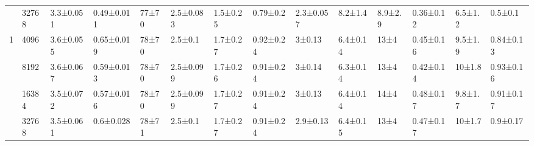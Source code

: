 \begin{table}
{\begin{tabular}{llllllllllllll}
 & 32768 & 3.3±0.051 & 0.49±0.011 & 77±70 & 2.5±0.083 & 1.5±0.25 & 0.79±0.2 & 2.3±0.057 & 8.2±1.4 & 8.9±2.9 & 0.36±0.12 & 6.5±1.2 & 0.5±0.1 \\
\cline{1-14}
\multirow[t]{4}{*}{1} & 4096 & 3.6±0.055 & 0.65±0.019 & 78±70 & 2.5±0.1 & 1.7±0.27 & 0.92±0.24 & 3±0.13 & 6.4±0.14 & 13±4 & 0.45±0.16 & 9.5±1.9 & 0.84±0.13 \\
 & 8192 & 3.6±0.067 & 0.59±0.013 & 78±70 & 2.5±0.099 & 1.7±0.26 & 0.91±0.24 & 3±0.14 & 6.3±0.14 & 13±4 & 0.42±0.14 & 10±1.8 & 0.93±0.16 \\
 & 16384 & 3.5±0.072 & 0.57±0.016 & 78±70 & 2.5±0.099 & 1.7±0.27 & 0.91±0.24 & 3±0.13 & 6.4±0.14 & 14±4 & 0.48±0.17 & 9.8±1.7 & 0.91±0.17 \\
 & 32768 & 3.5±0.061 & 0.6±0.028 & 78±71 & 2.5±0.1 & 1.7±0.27 & 0.91±0.24 & 2.9±0.13 & 6.4±0.15 & 13±4 & 0.47±0.17 & 10±1.7 & 0.9±0.17 \\
\cline{1-14}
\bottomrule
\end{tabular}
}
\end{table}


